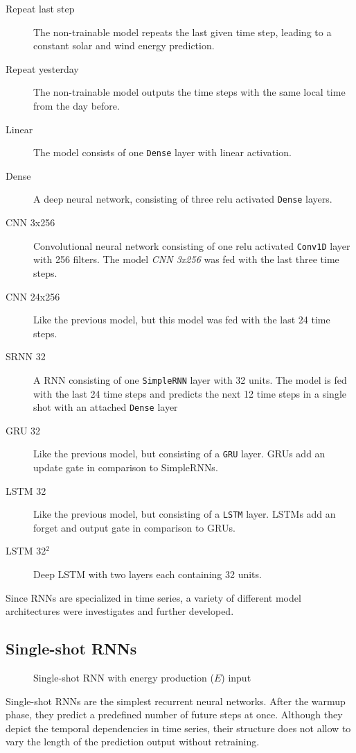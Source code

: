\documentclass[11pt,table]{article}
\begin{document}
\begin{description}
\item[Repeat last step] The non-trainable model repeats the last given time step, leading to a constant solar and wind energy prediction. 
\item[Repeat yesterday] The non-trainable model outputs the time steps with the same local time from the day before. 
\item[Linear] The model consists of one \texttt{Dense} layer with linear activation.
\item[Dense] A deep neural network, consisting of three \ac{relu} activated \texttt{Dense} layers. 
\item[CNN 3x256] Convolutional neural network consisting of one \ac{relu} activated \texttt{Conv1D} layer with 256 filters. The model \textit{CNN 3x256} was fed with the last three time steps.
\item[CNN 24x256] Like the previous model, but this model was fed with the last 24 time steps.
\item[SRNN 32] A \ac{RNN} consisting of one \texttt{SimpleRNN} layer with 32 units. The model is fed with the last 24 time steps and predicts the next 12 time steps in a single shot with an attached \texttt{Dense} layer
\item[GRU 32] Like the previous model, but consisting of a \texttt{GRU} layer. \Acp{GRU} add an update gate in comparison to SimpleRNNs.
\item[LSTM 32] Like the previous model, but consisting of a \texttt{LSTM} layer. \Acp{LSTM} add an forget and output gate in comparison to \acp{GRU}.
\item[LSTM 32$^2$] Deep \ac{LSTM} with two layers each containing 32 units.
\end{description}

Since \acp{RNN} are specialized in time series, a variety of different model architectures were investigates and further developed. 

\subsection{Single-shot \acp{RNN}}
\begin{figure}[hpt]
	\centering
	
	\caption{Single-shot RNN with energy production ($E$) input}
	\label{fig:SRNN}
\end{figure}
Single-shot \acp{RNN} are the simplest recurrent neural networks. After the warmup phase, they predict a predefined number of future steps at once. Although they depict the temporal dependencies in time series, their structure does not allow to vary the length of the prediction output without retraining.
\end{document}
